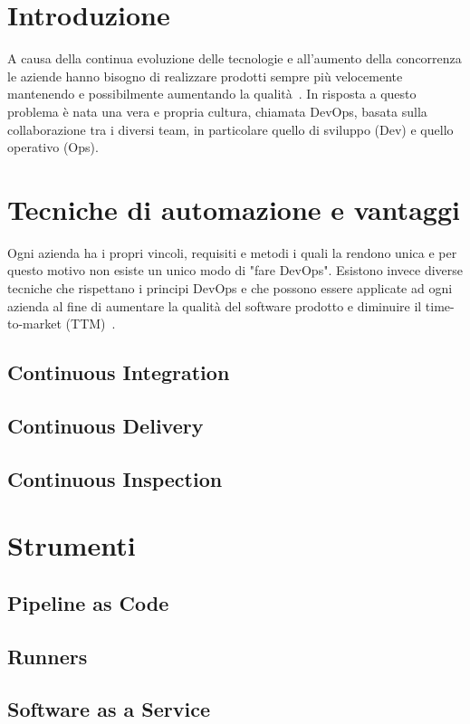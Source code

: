 
\section{Introduzione}
A causa della continua evoluzione delle tecnologie e all'aumento della concorrenza le aziende hanno bisogno di realizzare prodotti sempre più velocemente mantenendo e possibilmente aumentando la qualità~\cite{krief2019learning}. In risposta a questo problema è nata una vera e propria cultura, chiamata DevOps, basata sulla collaborazione tra i diversi team, in particolare quello di sviluppo (Dev) e quello operativo (Ops). 


\section{Tecniche di automazione e vantaggi}
Ogni azienda ha i propri vincoli, requisiti e metodi i quali la rendono unica e per questo motivo non esiste un unico modo di "fare DevOps". Esistono invece diverse tecniche che rispettano i principi DevOps e che possono essere applicate ad ogni azienda al fine di aumentare la qualità del software prodotto e diminuire il time-to-market (TTM)~\cite{devis2016effective}.

\subsection{Continuous Integration}

\subsection{Continuous Delivery}

\subsection{Continuous Inspection}

\section{Strumenti}
\subsection{Pipeline as Code}

\subsection{Runners}

\subsection{Software as a Service}
